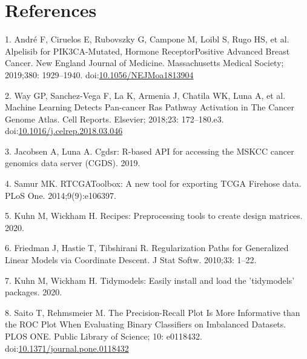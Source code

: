 \documentclass[10pt,letterpaper]{article}
\begin{document}
\hypertarget{references}{%
\section*{References}\label{references}}

\hypertarget{refs}{}
\leavevmode\hypertarget{ref-andre_2019_alpelisib_nengljmeda}{}%
1. André F, Ciruelos E, Rubovszky G, Campone M, Loibl S, Rugo HS, et al.
Alpelisib for PIK3CA-Mutated, Hormone ReceptorPositive Advanced Breast
Cancer. New England Journal of Medicine. Massachusetts Medical Society;
2019;380: 1929--1940.
doi:\href{https://doi.org/10.1056/NEJMoa1813904}{10.1056/NEJMoa1813904}

\leavevmode\hypertarget{ref-way_2018_machine_cellreports}{}%
2. Way GP, Sanchez-Vega F, La K, Armenia J, Chatila WK, Luna A, et al.
Machine Learning Detects Pan-cancer Ras Pathway Activation in The Cancer
Genome Atlas. Cell Reports. Elsevier; 2018;23: 172--180.e3.
doi:\href{https://doi.org/10.1016/j.celrep.2018.03.046}{10.1016/j.celrep.2018.03.046}

\leavevmode\hypertarget{ref-jacobsenCgdsrRbasedAPI2019}{}%
3. Jacobsen A, Luna A. Cgdsr: R-based API for accessing the MSKCC cancer
genomics data server (CGDS). 2019.

\leavevmode\hypertarget{ref-samurRTCGAToolboxNewTool2014}{}%
4. Samur MK. RTCGAToolbox: A new tool for exporting TCGA Firehose data.
PLoS One. 2014;9(9):e106397.

\leavevmode\hypertarget{ref-kuhnRecipesPreprocessingTools2020}{}%
5. Kuhn M, Wickham H. Recipes: Preprocessing tools to create design
matrices. 2020.

\leavevmode\hypertarget{ref-friedmanRegularizationPathsGeneralized2010}{}%
6. Friedman J, Hastie T, Tibshirani R. Regularization Paths for
Generalized Linear Models via Coordinate Descent. J Stat Softw. 2010;33:
1--22.

\leavevmode\hypertarget{ref-kuhnTidymodelsEasilyInstall2020}{}%
7. Kuhn M, Wickham H. Tidymodels: Easily install and load the
'tidymodels' packages. 2020.

\leavevmode\hypertarget{ref-saitoPrecisionRecallPlotMore2015}{}%
8. Saito T, Rehmsmeier M. The Precision-Recall Plot Is More Informative
than the ROC Plot When Evaluating Binary Classifiers on Imbalanced
Datasets. PLOS ONE. Public Library of Science; 10: e0118432.
doi:\href{https://doi.org/10.1371/journal.pone.0118432}{10.1371/journal.pone.0118432}

\nolinenumbers
\end{document}
